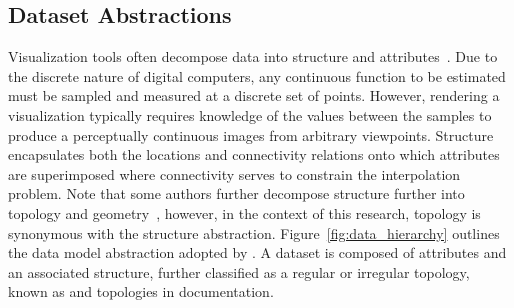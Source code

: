 \subsection{Dataset Abstractions}
Visualization tools often decompose data into structure and
attributes~\cite{vtk}. Due to the discrete nature of digital
computers, any continuous function to be estimated must be sampled and
measured at a discrete set of points. However, rendering a
visualization typically requires knowledge of the values between the
samples to produce a perceptually continuous images from arbitrary
viewpoints. Structure encapsulates both the locations and connectivity
relations onto which attributes are superimposed where connectivity
serves to constrain the interpolation problem. Note that some authors
further decompose structure further into topology and
geometry~\cite{weiler}, however, in the context of this research,
topology is synonymous with the structure
abstraction. Figure~\ref{fig:data_hierarchy} outlines the data model
abstraction adopted by \sciwms{}. A dataset is composed of attributes
and an associated structure, further classified as a regular or
irregular topology, known as \cgrid{} and \ugrid{} topologies in
\sciwms{} documentation.

